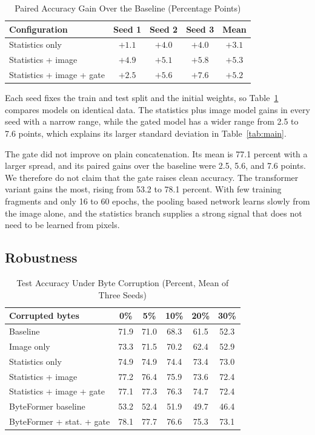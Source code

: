 \documentclass[journal]{IEEEtran}
\begin{document}
\begin{table}[t]
\caption{Paired Accuracy Gain Over the Baseline (Percentage Points)}
\label{tab:paired}
\centering
\begin{tabular}{lcccc}
\hline
Configuration & Seed 1 & Seed 2 & Seed 3 & Mean \\
\hline
Statistics only & $+1.1$ & $+4.0$ & $+4.0$ & $+3.1$ \\
Statistics + image & $+4.9$ & $+5.1$ & $+5.8$ & $+5.3$ \\
Statistics + image + gate & $+2.5$ & $+5.6$ & $+7.6$ & $+5.2$ \\
\hline
\end{tabular}
\end{table}

Each seed fixes the train and test split and the initial weights, so Table~\ref{tab:paired} compares models on identical data. The statistics plus image model gains in every seed with a narrow range, while the gated model has a wider range from 2.5 to 7.6 points, which explains its larger standard deviation in Table~\ref{tab:main}.

The gate did not improve on plain concatenation. Its mean is 77.1 percent with a larger spread, and its paired gains over the baseline were 2.5, 5.6, and 7.6 points. We therefore do not claim that the gate raises clean accuracy. The transformer variant gains the most, rising from 53.2 to 78.1 percent. With few training fragments and only 16 to 60 epochs, the pooling based network learns slowly from the image alone, and the statistics branch supplies a strong signal that does not need to be learned from pixels.

\subsection{Robustness}
\begin{table}[t]
\caption{Test Accuracy Under Byte Corruption (Percent, Mean of Three Seeds)}
\label{tab:rob}
\centering
\begin{tabular}{lccccc}
\hline
Corrupted bytes & 0\% & 5\% & 10\% & 20\% & 30\% \\
\hline
Baseline & 71.9 & 71.0 & 68.3 & 61.5 & 52.3 \\
Image only & 73.3 & 71.5 & 70.2 & 62.4 & 52.9 \\
Statistics only & 74.9 & 74.9 & 74.4 & 73.4 & 73.0 \\
Statistics + image & 77.2 & 76.4 & 75.9 & 73.6 & 72.4 \\
Statistics + image + gate & 77.1 & 77.3 & 76.3 & 74.7 & 72.4 \\
\hline
ByteFormer baseline & 53.2 & 52.4 & 51.9 & 49.7 & 46.4 \\
ByteFormer + stat. + gate & 78.1 & 77.7 & 76.6 & 75.3 & 73.1 \\
\hline
\end{tabular}
\end{table}
\end{document}
